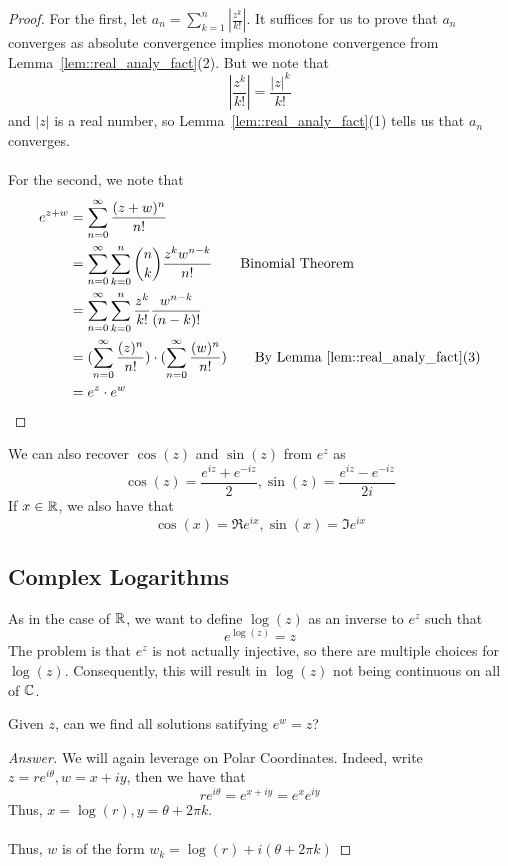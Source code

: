 \documentclass{article}
\begin{document}
\begin{proof}
For the first, let $a_n = \sum_{k = 1}^n |\frac{z^k}{k!}|$. It suffices for us to prove that $a_n$ converges as absolute convergence implies monotone convergence from Lemma~\ref{lem::real_analy_fact}(2). But we note that 
\[|\frac{z^k}{k!}| = \frac{|z|^k}{k!}\]
and $|z|$ is a real number, so Lemma~\ref{lem::real_analy_fact}(1) tells us that $a_n$ converges.\\\\
For the second, we note that
\begin{align*}
    e^{z + w} &= \sum_{n = 0}^\infty \frac{(z + w)^n}{n!}\\
    &= \sum_{n = 0}^\infty \sum_{k = 0}^n {n \choose k} \frac{z^k w^{n-k}}{n!} \tag*{Binomial Theorem}\\
    &= \sum_{n = 0}^\infty \sum_{k = 0}^n \frac{z^k}{k!} \frac{w^{n-k}}{(n - k)!}\\
    &= (\sum_{n = 0}^\infty \frac{(z)^n}{n!}) \cdot (\sum_{n = 0}^\infty \frac{(w)^n}{n!}) \tag*{By Lemma~\ref{lem::real_analy_fact}(3)}\\
    &= e^z \cdot e^w
\end{align*}
\end{proof}

\begin{proposition}
We can also recover $\cos(z)$ and $\sin(z)$ from $e^z$ as
\[\cos(z) = \frac{e^{iz} + e^{-iz}}{2}, \sin(z) = \frac{e^{iz} - e^{-iz}}{2i}\]
If $x \in \mathbb{R}$, we also have that
\[\cos(x) = \Re e^{ix}, \sin(x) = \Im e^{ix}\]
\end{proposition}

\subsection{Complex Logarithms}

As in the case of $\mathbb{R}$, we want to define $\log(z)$ as an inverse to $e^z$ such that
\[e^{\log(z)} = z\]
The problem is that $e^z$ is not actually injective, so there are multiple choices for $\log(z)$. Consequently, this will result in $\log(z)$ not being continuous on all of $\mathbb{C}$.

\begin{question}
Given $z$, can we find all solutions satifying $e^w = z$?
\end{question}

\begin{proof}[Answer]
We will again leverage on Polar Coordinates. Indeed, write $z = re^{i \theta}, w = x + iy$, then we have that
\[r e^{i \theta} = e^{x + iy} = e^{x} e^{iy}\]
Thus, $x = \log(r), y = \theta + 2 \pi k$.\\\\
Thus, $w$ is of the form $w_k = \log(r) + i(\theta + 2 \pi k)$
\end{proof}
\end{document}

